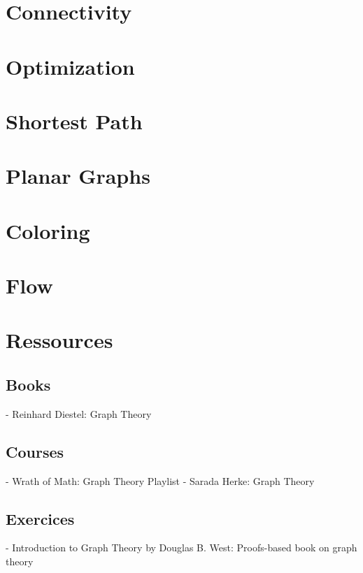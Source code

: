 \documentclass{article}
\begin{document}
\section{Connectivity}
\section{Optimization}
\section{Shortest Path}
\section{Planar Graphs}
\section{Coloring}
\section{Flow}

\section{Ressources}%
\label{sec:Ressources}

\subsection{Books}%
\label{sub:Books}

- Reinhard Diestel: Graph Theory

\subsection{Courses}%
\label{sub:Courses}

- Wrath of Math: Graph Theory Playlist
- Sarada Herke: Graph Theory

\subsection{Exercices}%
\label{sub:Exercices}

- Introduction to Graph Theory by Douglas B. West: Proofs-based book on
graph theory
\end{document}
